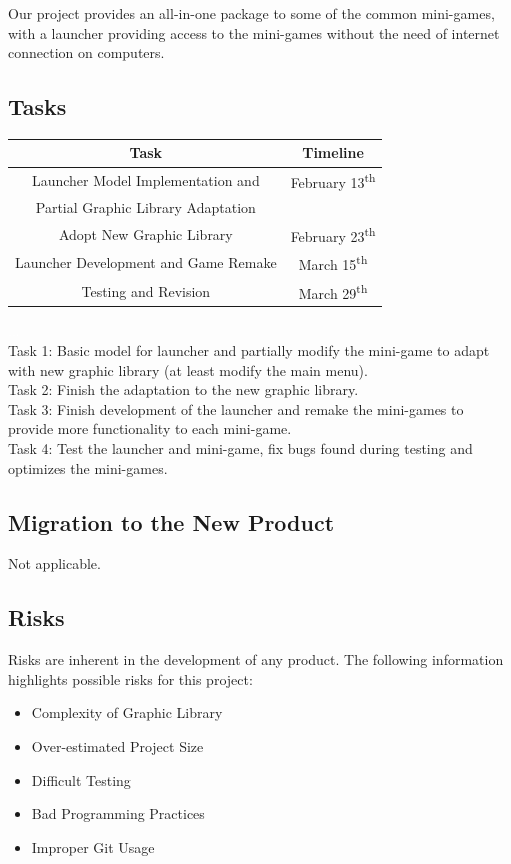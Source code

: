 \documentclass[12pt, titlepage]{article}
\begin{document}
Our project provides an all-in-one package to some of the common mini-games, with a launcher providing access to the mini-games without the need of internet connection on computers.

\subsection{Tasks}

\begin{center}
\begin{tabular}{ |c|c| } 
\hline
\textbf{Task} & \textbf{Timeline}\\
\hline
Launcher Model Implementation and  & February 13\textsuperscript{th}\\
Partial Graphic Library Adaptation &\\
\hline
Adopt New Graphic Library & February 23\textsuperscript{th}\\
\hline
Launcher Development and Game Remake & March 15\textsuperscript{th}\\
\hline
Testing and Revision & March 29\textsuperscript{th}\\
\hline
\end{tabular}
\end{center}

\textcolor{white}{...}\\ %
Task 1: Basic model for launcher and partially modify the mini-game to adapt with new graphic library (at least modify the main menu).\\
Task 2: Finish the adaptation to the new graphic library.\\
Task 3: Finish development of the launcher and remake the mini-games to provide more functionality to each mini-game.\\
Task 4: Test the launcher and mini-game, fix bugs found during testing and optimizes the mini-games.

\subsection{Migration to the New Product}

Not applicable.

\subsection{Risks}

Risks are inherent in the development of any product. The following information highlights possible risks for this project:
\begin{itemize}
    \item Complexity of Graphic Library
    \item Over-estimated Project Size
    \item Difficult Testing
    \item Bad Programming Practices
    \item Improper Git Usage
\end{itemize}
\end{document}
